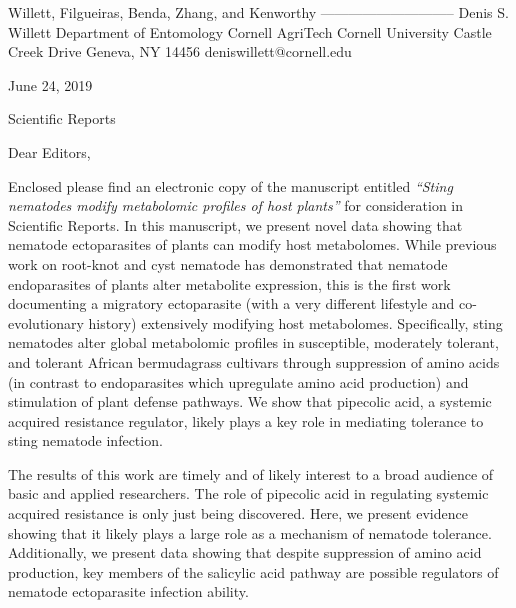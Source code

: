 \documentclass{article}
\begin{document}
\begin{addmargin}[2.8in]{}
Willett, Filgueiras, \newline
Benda, Zhang, and Kenworthy \newline
----------------------------- \newline
Denis S. Willett\newline
Department of Entomology \newline
Cornell AgriTech  \newline
Cornell University  Castle Creek Drive \newline
Geneva, NY 14456 \newline
deniswillett@cornell.edu \newline
\end{addmargin}
\setlength{\parindent}{0cm}

June 24, 2019

\vspace{1.24em}

Scientific Reports

\vspace{1.24em}

Dear Editors,

\vspace{0.48em}
\setlength{\parindent}{1.24cm}

Enclosed please find an electronic copy of the manuscript entitled \textit{“Sting nematodes modify metabolomic profiles of host plants”} for consideration in Scientific Reports.  In this manuscript, we present novel data showing that nematode ectoparasites of plants can modify host metabolomes.  While previous work on root-knot and cyst nematode has demonstrated that nematode endoparasites of plants alter metabolite expression, this is the first work documenting a migratory ectoparasite (with a very different lifestyle and co-evolutionary history) extensively modifying host metabolomes.  Specifically, sting nematodes alter global metabolomic profiles in susceptible, moderately tolerant, and tolerant African bermudagrass cultivars through suppression of amino acids (in contrast to endoparasites which upregulate amino acid production) and stimulation of plant defense pathways.  We show that pipecolic acid, a systemic acquired resistance regulator, likely plays a key role in mediating tolerance to sting nematode infection.  


The results of this work are timely and of likely interest to a broad audience of basic and applied researchers. The role of pipecolic acid in regulating systemic acquired resistance is only just being discovered.  Here, we present evidence showing that it likely plays a large role as a mechanism of nematode tolerance.  Additionally, we present data showing that despite suppression of amino acid production, key members of the salicylic acid pathway are possible regulators of nematode ectoparasite infection ability.  
\end{document}
